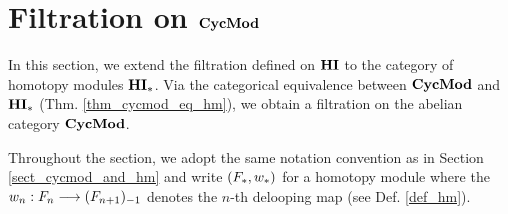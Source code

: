 \newpage
\section{Filtration on $\mathbf{CycMod}$}\label{sect_filtration_cycmod}

In this section, we extend the filtration defined on $\mathbf{HI}$ to the 
category of homotopy modules $\mathbf{HI}_*$. Via the categorical 
equivalence between $\mathbf{CycMod}$ and $\mathbf{HI}_*$ (Thm. 
\ref{thm_cycmod_eq_hm}), we obtain a filtration on the abelian 
category $\mathbf{CycMod}$.

Throughout the section, we adopt the same notation convention as 
in Section \ref{sect_cycmod_and_hm} and write $(F_*, w_*)$ for 
a homotopy module where the $w_n: F_{n} \longrightarrow (F_{n + 1})_{-1}$ 
denotes the $n$-th delooping map (see Def. \ref{def_hm}).



